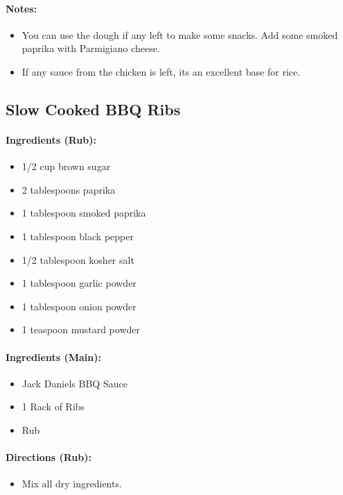 \documentclass{article}
\begin{document}
\paragraph{Notes:}
\begin{itemize}
    \item You can use the dough if any left to make some snacks. Add some smoked paprika with Parmigiano cheese.
    \item If any sauce from the chicken is left, its an excellent base for rice.
\end{itemize}

\subsection{Slow Cooked BBQ Ribs} 

\paragraph{Ingredients (Rub):}
\begin{itemize}
    \item 1/2 cup brown sugar
    \item 2 tablespoons paprika
    \item 1 tablespoon smoked paprika
    \item 1 tablespoon black pepper
    \item 1/2 tablespoon kosher salt
    \item 1 tablespoon garlic powder
    \item 1 tablespoon onion powder
    \item 1 teaspoon mustard powder
\end{itemize}  

\paragraph{Ingredients (Main):}
\begin{itemize}
    \item Jack Daniels BBQ Sauce
    \item 1 Rack of Ribs
    \item Rub
\end{itemize}  

\paragraph{Directions (Rub):}
\begin{itemize}
    \item Mix all dry ingredients.
\end{itemize}  
\end{document}
